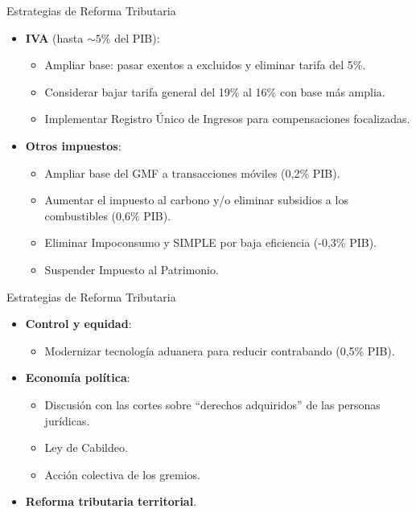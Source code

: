 \begin{frame}{Estrategias de Reforma Tributaria}
\begin{itemize}
    \item \textbf{IVA} (hasta $\sim 5\%$ del PIB):
    \begin{itemize}
        \item Ampliar base: pasar exentos a excluidos y eliminar tarifa del 5\%.
        \item Considerar bajar tarifa general del 19\% al 16\% con base más amplia.
        \item Implementar Registro Único de Ingresos para compensaciones focalizadas.
    \end{itemize}
    \item \textbf{Otros impuestos}:
    \begin{itemize}
        \item Ampliar base del GMF a transacciones móviles (0,2\% PIB).
        \item Aumentar el impuesto al carbono y/o eliminar subsidios a los combustibles (0,6\% PIB).
        \item Eliminar Impoconsumo y SIMPLE por baja eficiencia (-0,3\% PIB).
        \item Suspender Impuesto al Patrimonio.
    \end{itemize}
\end{itemize}
\end{frame}



\begin{frame}{Estrategias de Reforma Tributaria}
\begin{itemize}    
    \item \textbf{Control y equidad}:
    \begin{itemize}
        \item Modernizar tecnología aduanera para reducir contrabando (0,5\% PIB).
    \end{itemize}
    \item \textbf{Economía política}:
    \begin{itemize}    
        \item Discusión con las cortes sobre ``derechos adquiridos'' de las personas jurídicas.
        \item Ley de Cabildeo.
        \item Acción colectiva de los gremios.
    \end{itemize}
    \item \textbf{Reforma tributaria territorial}.
\end{itemize}
\end{frame}
